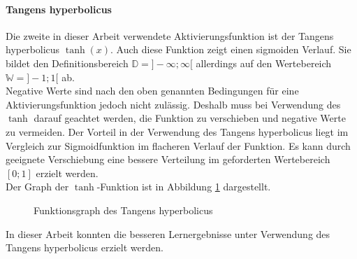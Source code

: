 \documentclass[../main.tex]{subfiles}
\begin{document}
\paragraph{Tangens hyperbolicus}
Die zweite in dieser Arbeit verwendete Aktivierungsfunktion ist der Tangens hyperbolicus $\tanh(x)$. Auch diese Funktion zeigt einen sigmoiden Verlauf. Sie bildet den Definitionsbereich $\mathbb{D}= ]-\infty;\infty[$ allerdings auf den Wertebereich $\mathbb{W} = ]-1;1[$ ab. \\ Negative Werte sind nach den oben genannten Bedingungen für eine Aktivierungsfunktion jedoch nicht zulässig. Deshalb muss bei Verwendung des $\tanh$ darauf geachtet werden, die Funktion zu verschieben und negative Werte zu vermeiden. Der Vorteil in der Verwendung des Tangens hyperbolicus liegt im Vergleich zur Sigmoidfunktion im flacheren Verlauf der Funktion. Es kann durch geeignete Verschiebung eine bessere Verteilung im geforderten Wertebereich $[0;1]$ erzielt werden.\\ Der Graph der $\tanh$-Funktion ist in Abbildung \ref{fig:tanh_function} dargestellt.
\begin{figure} 
	\centering
	\caption{Funktionsgraph des Tangens hyperbolicus}\label{fig:tanh_function}
\end{figure}
In dieser Arbeit konnten die besseren Lernergebnisse unter Verwendung des Tangens hyperbolicus erzielt werden.
\end{document}
